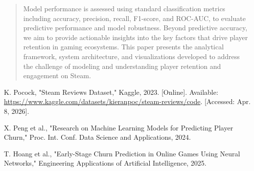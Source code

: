 \documentclass[conference]{IEEEtran}
\begin{document}
\begin{abstract}
Model performance is assessed using standard classification metrics including accuracy, precision, recall, F1-score, and ROC-AUC, to evaluate predictive performance and model robustness. Beyond predictive accuracy, we aim to provide actionable insights into the key factors that drive player retention in gaming ecosystems. This paper presents the analytical framework, system architecture, and visualizations developed to address the challenge of modeling and understanding player retention and engagement on Steam. 
\end{abstract}

\begin{thebibliography}{1}

K. Pocock, "Steam Reviews Dataset," Kaggle, 2023. [Online]. Available: \url{https://www.kaggle.com/datasets/kieranpoc/steam-reviews/code}. [Accessed: Apr. 8, 2026].

X. Peng et al., "Research on Machine Learning Models for Predicting Player Churn," Proc. Int. Conf. Data Science and Applications, 2024.

T. Hoang et al., "Early-Stage Churn Prediction in Online Games Using Neural Networks," Engineering Applications of Artificial Intelligence, 2025.

\end{thebibliography}
\end{document}
